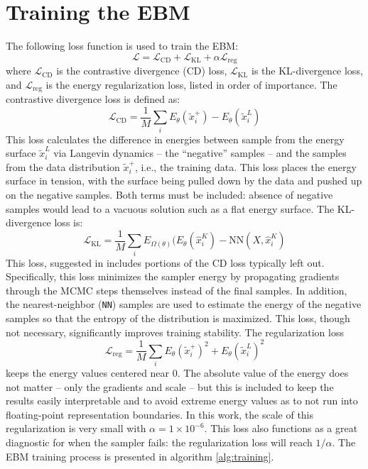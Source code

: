 \section{Training the EBM}
The following loss function is used to train the EBM:
\begin{equation}
	\mathcal{L} = \mathcal{L}_\text{CD} + \mathcal{L}_\text{KL} + \alpha \mathcal{L}_\text{reg}
\end{equation}
where $\mathcal{L}_\text{CD}$ is the contrastive divergence (CD) loss, $\mathcal{L}_\text{KL}$ is the KL-divergence loss, and $\mathcal{L}_\text{reg}$ is the energy regularization loss, listed in order of importance.
The contrastive divergence loss is defined as:
\begin{equation}
	\mathcal{L}_\text{CD} = \frac{1}{M} \sum_i E_\theta(\tilde{x}_{i}^+) - E_\theta(\tilde{x}_{i}^L)
\end{equation}
This loss calculates the difference in energies between sample from the energy surface $\tilde{x}_{i}^L$ via Langevin dynamics -- the ``negative'' samples -- and the samples from the data distribution $\tilde{x}_{i}^+$, i.e., the training data. This loss places the energy surface in tension, with the surface being pulled down by the data and pushed up on the negative samples. Both terms must be included: absence of negative samples would lead to a vacuous solution such as a flat energy surface.
The KL-divergence loss is:
\begin{equation}
	\mathcal{L}_\text{KL} = \frac{1}{M} \sum_i E_{\Omega(\theta)}(E_\theta(\hat{x}_{i}^K) - \text{NN}(X, \hat{x}_{i}^K)
\end{equation}
This loss, suggested in \cite{du_improved_2021} includes portions of the CD loss typically left out. Specifically, this loss minimizes the sampler energy by propagating gradients through the MCMC steps themselves instead of the final samples. In addition, the nearest-neighbor (\texttt{NN}) samples are used to estimate the energy of the negative samples so that the entropy of the distribution is maximized. This loss, though not necessary, significantly improves training stability. 
The regularization loss
\begin{equation}
	\mathcal{L}_\text{reg} = \frac{1}{M} \sum_i E_\theta(\tilde{x}_{i}^+)^2 + E_\theta(\tilde{x}_{i}^L)^2
\end{equation}
keeps the energy values centered near 0. The absolute value of the energy does not matter -- only the gradients and scale -- but this  is included to keep the results easily interpretable and to avoid extreme energy values as to not run into floating-point representation boundaries. In this work, the scale of this regularization is very small with $\alpha = 1 \times 10^{-6}$. This loss also functions as a great diagnostic for when the sampler fails: the regularization loss will reach $1/\alpha$. The EBM training process is presented in algorithm \ref{alg:training}.

